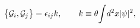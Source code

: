 \begin{equation}
     \big\{{\cal G}_{i},{\cal G}_{j}\big\}=\epsilon_{ij}k,
     \qquad
     k\equiv
     \theta\!\int\! d^2x\vert\psi\vert^2,
     \label{exoticcharge}
\end{equation}

